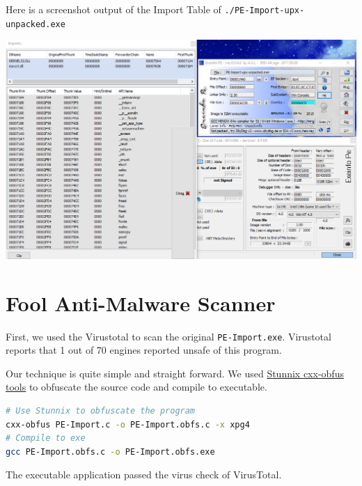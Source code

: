 \documentclass[11pt]{article}
\begin{document}
Here is a screenshot output of the Import Table of \lstinline{./PE-Import-upx-unpacked.exe} 
\begin{center}
    \includegraphics[width=\textwidth]{Assignment/2/Q1/sc_import_table_pe_upx_unpacked.png}
\end{center}

\section{Fool Anti-Malware Scanner}

First, we used the Virustotal to scan the original \lstinline{PE-Import.exe}. Virustotal reports that 1 out of 70 engines reported unsafe of this program. 

Our technique is quite simple and straight forward. We used \href{http://stunnix.com/prod/cxxo/}{Stunnix cxx-obfus tools} to obfuscate the source code and compile to executable. 

\begin{lstlisting}[language=bash]
# Use Stunnix to obfuscate the program
cxx-obfus PE-Import.c -o PE-Import.obfs.c -x xpg4
# Compile to exe
gcc PE-Import.obfs.c -o PE-Import.obfs.exe
\end{lstlisting}

The executable application passed the virus check of VirusTotal.
\end{document}
